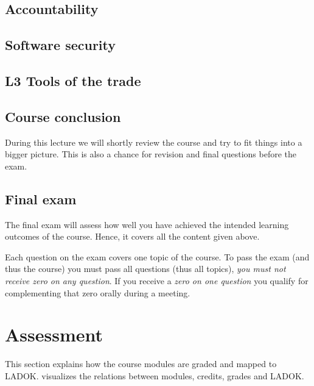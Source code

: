 {\subsection{Accountability}%
\label{accountability}


\subsection{Software security}%
\label{software}


\subsection{L3 Tools of the trade}\label{tools}


\subsection{Course conclusion}\label{conclusion}

During this lecture we will shortly review the course and try to fit things 
into a bigger picture.
This is also a chance for revision and final questions before the exam.

\subsection{Final exam}

The final exam will assess how well you have achieved the intended learning 
outcomes of the course.
Hence, it covers all the content given above.

Each question on the exam covers one topic of the course.
To pass the exam (and thus the course) you must pass all questions (thus all 
topics), \ie \emph{you must not receive zero on any question}.
If you receive a \emph{zero on one question} you qualify for complementing that 
zero orally during a meeting.
} %


\section{Assessment}%
\label{Assessment}


This section explains how the course modules are graded and mapped to LADOK\@.
 visualizes the relations between modules, credits, grades and 
LADOK\@.

